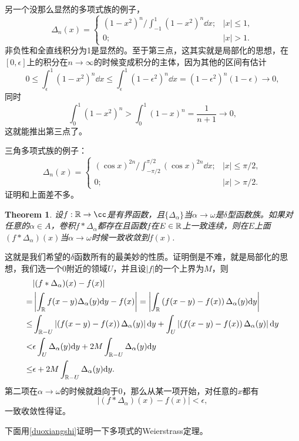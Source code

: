\documentclass[10pt]{book}
\theoremstyle{plain}%
\newtheorem{theo}{Theorem}[chapter]%
\begin{document}
另一个没那么显然的多项式族的例子，
\begin{equation}
\label{duoxiangshi}
	\Delta_n(x)=
	\begin{cases}
		\displaystyle{(1-x^2)^n\bigg/\int_{-1}^1(1-x^2)^n\dd x};&|x|\leq 1,\\
		0;&|x|> 1.
	\end{cases}
\end{equation}
非负性和全直线积分为1是显然的。至于第三点，这其实就是局部化的思想，在$[0,\epsilon]$上的积分在$n\to \infty$的时候变成积分的主体，因为其他的区间有估计
\[
0\leq \int_\epsilon^1 (1-x^2)^n\dd x\leq \int_\epsilon^1 (1-\epsilon^2)^n\dd x=(1-\epsilon^2)^n(1-\epsilon)\to 0,
\]
同时
\[
\int_0^1 (1-x^2)^n>\int_0^1 (1-x)^n=\frac{1}{n+1}\to 0,
\]
这就能推出第三点了。

三角多项式族的例子：
\[
	\Delta_n(x)=
	\begin{cases}
		\displaystyle{(\cos x)^{2n}\bigg/\int_{-\pi/2}^{\pi/2}(\cos x)^{2n}\dd x};&|x|\leq \pi/2,\\
		0;&|x|> \pi/2.
	\end{cases}
\]
证明和上面差不多。
\begin{theo}
设$f:\rr\to\cc$是有界函数，且$\{\Delta_\alpha\}$当$\alpha\to\omega$是$\delta$型函数族。如果对任意的$\alpha\in A$，卷积$f*\Delta_\alpha$都存在且函数$f$在$E\in \mathbb{R}$上一致连续，则在$E$上面$(f*\Delta_\alpha)(x)$当$\alpha\to\omega$时候一致收敛到$f(x)$.
\end{theo}
这就是我们希望的$\delta$函数所有的最美妙的性质。证明倒是不难，就是局部化的思想，我们选一个$0$附近的领域$U$，并且设$|f|$的一个上界为$M$，则
\[
\begin{split}
	&|(f*\Delta_\alpha)(x)-f(x)|\\
	=&\left|\int_{\mathbb{R}} f(x-y)\Delta_\alpha(y)\mathrm{d} y-f(x)\right|=\left|\int_{\mathbb{R}}\left(f(x-y)-f(x)\right)\Delta_\alpha(y)\mathrm{d} y\right|\\
	\leq&\int_{\mathbb{R}-U}\left|\left(f(x-y)-f(x)\right)\Delta_\alpha(y)\right|\mathrm{d} y+\int_{U}\left|\left(f(x-y)-f(x)\right)\Delta_\alpha(y)\right|\mathrm{d} y\\
	<&\epsilon \int_{U}\Delta_\alpha(y)\mathrm{d} y+2M\int_{\mathbb{R}-U}\Delta_\alpha(y)\mathrm{d} y\\
	\leq&\epsilon+2M\int_{\mathbb{R}-U}\Delta_\alpha(y)\mathrm{d} y.
	\end{split}
\]
第二项在$\alpha\to\omega$的时候就趋向于0，那么从某一项开始，对任意的$x$都有
\[
|(f*\Delta_\alpha)(x)-f(x)|<\epsilon,
\]
一致收敛性得证。

下面用\eqref{duoxiangshi}证明一下多项式的Weierstrass定理。
\end{document}
